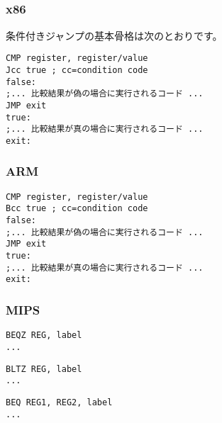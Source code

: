 \label{sec:Jcc}






\subsection{\Conclusion{}}

\subsubsection{x86}

条件付きジャンプの基本骨格は次のとおりです。

\begin{lstlisting}[caption=x86,style=customasmx86]
CMP register, register/value
Jcc true ; cc=condition code
false:
;... 比較結果が偽の場合に実行されるコード ...
JMP exit 
true:
;... 比較結果が真の場合に実行されるコード ...
exit:
\end{lstlisting}

\subsubsection{ARM}

\begin{lstlisting}[caption=ARM,style=customasmARM]
CMP register, register/value
Bcc true ; cc=condition code
false:
;... 比較結果が偽の場合に実行されるコード ...
JMP exit 
true:
;... 比較結果が真の場合に実行されるコード ...
exit:
\end{lstlisting}

\subsubsection{MIPS}

\begin{lstlisting}[caption=Check for zero,style=customasmMIPS]
BEQZ REG, label
...
\end{lstlisting}

\begin{lstlisting}[caption=Check for less than zero using pseudoinstruction,style=customasmMIPS]
BLTZ REG, label
...
\end{lstlisting}

\begin{lstlisting}[caption=Check for equal values,style=customasmMIPS]
BEQ REG1, REG2, label
...
\end{lstlisting}

